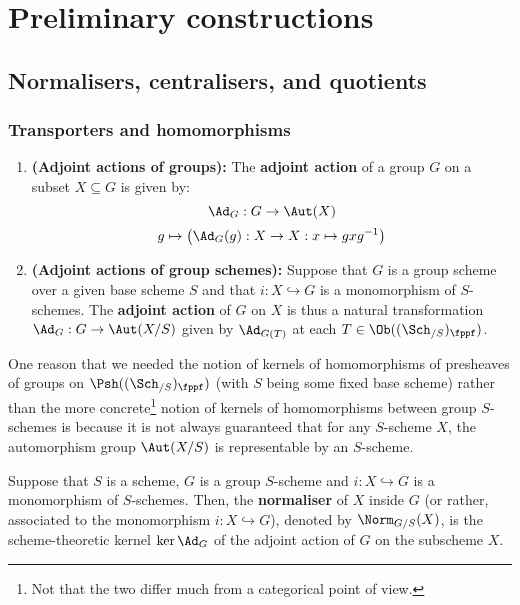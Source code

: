 \section{Preliminary constructions}
    \subsection{Normalisers, centralisers, and quotients}
        \subsubsection{Transporters and homomorphisms}
            \begin{definition} \label{def: adjoint_actions}
                \noindent
                \begin{enumerate}
                    \item \textbf{(Adjoint actions of groups):} The \textbf{adjoint action} of a group $G$ on a subset $X \subseteq G$ is given by:
                        $$\Ad_G: G \to \Aut(X)$$
                        $$g \mapsto \left(\Ad_G(g): X \to X: x \mapsto gxg^{-1}\right)$$
                    \item \textbf{(Adjoint actions of group schemes):} Suppose that $G$ is a group scheme over a given base scheme $S$ and that $i: X \hookrightarrow G$ is a monomorphism of $S$-schemes. The \textbf{adjoint action} of $G$ on $X$ is thus a natural transformation $\Ad_G: G \to \Aut(X/S)$ given by $\Ad_{G(T)}$ at each $T \in \Ob((\Sch_{/S})_{\fppf})$.
                \end{enumerate}
            \end{definition}
            \begin{remark} \label{remark: representability_of_automorphism_groups_of_schemes}
                One reason that we needed the notion of kernels of homomorphisms of presheaves of groups on $\Psh((\Sch_{/S})_{\fppf})$ (with $S$ being some fixed base scheme) rather than the more concrete\footnote{Not that the two differ much from a categorical point of view.} notion of kernels of homomorphisms between group $S$-schemes is because it is not always guaranteed that for any $S$-scheme $X$, the automorphism group $\Aut(X/S)$ is representable by an $S$-scheme. 
            \end{remark}
            \begin{definition}[Normalisers] \label{def: normalisers}
                Suppose that $S$ is a scheme, $G$ is a group $S$-scheme and $i: X \hookrightarrow G$ is a monomorphism of $S$-schemes. Then, the \textbf{normaliser} of $X$ inside $G$ (or rather, associated to the monomorphism $i: X \hookrightarrow G$), denoted by $\Norm_{G/S}(X)$, is the scheme-theoretic kernel $\ker \Ad_G$ of the adjoint action of $G$ on the subscheme $X$.
            \end{definition}
